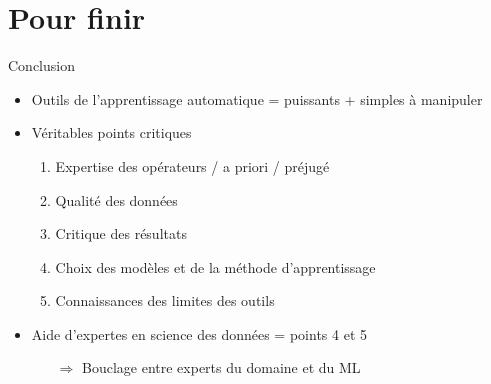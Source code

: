 \documentclass[presentation, aspectratio=169]{beamer}
\begin{document}
\section{Pour finir}

\begin{frame}{Conclusion}
  \begin{itemize}
  \item Outils de l'apprentissage automatique = puissants + simples
    à manipuler
  \item Véritables points critiques
    \begin{enumerate}
    \item Expertise des opérateurs / a priori / préjugé
    \item Qualité des données
    \item Critique des résultats
    \item Choix des modèles et de la méthode d'apprentissage
    \item Connaissances des limites des outils
    \end{enumerate}
  \item Aide d'expertes en science des données = points 4 et 5
    \begin{itemize}
    \item[$\Longrightarrow$] Bouclage entre experts du domaine et du ML
    \end{itemize}
  \end{itemize}
\end{frame}
\end{document}
